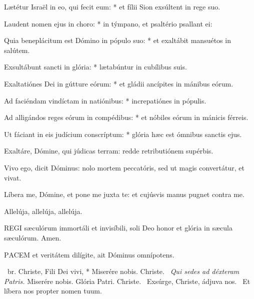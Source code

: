 Lætétur Israël in eo, qui fecit eum: * et fílii Sion exsúltent in rege suo.

Laudent nomen ejus in choro: * in týmpano, et psaltério psallant ei:

Quia beneplácitum est Dómino in pópulo suo: * et exaltábit mansuétos in salútem.

Exsultábunt sancti in glória: * lætabúntur in cubílibus suis.

Exaltatiónes Dei in gútture eórum: * et gládii ancípites in mánibus eórum.

Ad faciéndam vindíctam in natiónibus: * increpatiónes in pópulis.

Ad alligándos reges eórum in compédibus: * et nóbiles eórum in mánicis férreis.

Ut fáciant in eis judícium conscríptum: * glória hæc est ómnibus sanctis ejus.


  Exaltáre, Dómine, qui júdicas terram: redde retributiónem supérbis.



 Vivo ego, dicit Dóminus: nolo mortem peccatóris, sed ut magis convertátur, et vivat.


 Líbera me, Dómine, et pone me juxta te: et cujúsvis manus pugnet contra me.

  Allelúja, allelúja, allelúja.



\lettrine[lines=2]{R}{EGI} sæculórum immortáli et invisíbili, soli Deo honor et glória in sæcula sæculórum. Amen.



\lettrine[lines=2]{P}{ACEM} et veritátem dilígite, ait Dóminus omnípotens.

\R\ br. Christe, Fili Dei vivi, * Miserére nobis. Christe. \V\ \textit{Qui sedes ad déxteram Patris.} Miserére nobis. Glória Patri. Christe. \V\ Exsúrge, Christe, ádjuva nos. \R\ Et líbera nos propter nomen tuum.

